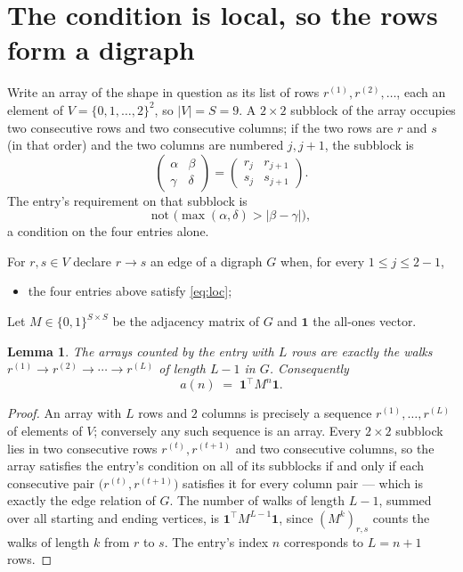 \documentclass[11pt,a4paper]{article}
\theoremstyle{plain}
\newtheorem{lemma}[theorem]{Lemma}
\theoremstyle{definition}
\begin{document}
\section{The condition is local, so the rows form a digraph}

Write an array of the shape in question as its list of rows
$r^{(1)},r^{(2)},\dots$, each an element of
$V=\{0,1,\dots,2\}^{2}$, so $|V|=S=9$. A $2\times2$ subblock of the array
occupies two consecutive rows and two consecutive columns; if the two rows are $r$
and $s$ (in that order) and the two columns are numbered $j,j+1$,
the subblock is
\[
\begin{pmatrix}\alpha&\beta\\\gamma&\delta\end{pmatrix}=\begin{pmatrix}r_j&r_{j+1}\\s_j&s_{j+1}\end{pmatrix}.
\]
The entry's requirement on that subblock is
\begin{equation}\label{eq:loc}
\text{not }\bigl(\max(\alpha,\delta)>|\beta-\gamma|\bigr),
\end{equation}
a condition on the four entries alone.

For $r,s\in V$ declare $r\to s$ an edge of a digraph $G$ when, for every
$1\le j\le 2-1$,
\begin{itemize}
\item the four entries above satisfy \eqref{eq:loc};

\end{itemize}
Let $M\in\{0,1\}^{S\times S}$ be the adjacency matrix of $G$ and $\mathbf{1}$ the
all-ones vector.

\begin{lemma}\label{lem:walk}
The arrays counted by the entry with $L$ rows are exactly the walks
$r^{(1)}\to r^{(2)}\to\cdots\to r^{(L)}$ of length $L-1$ in $G$. Consequently
\[
a(n)\;=\;\mathbf{1}^{\!\top}M^{n}\mathbf{1} .
\]
\end{lemma}

\begin{proof}
An array with $L$ rows and $2$ columns is precisely a sequence
$r^{(1)},\dots,r^{(L)}$ of elements of $V$; conversely any such sequence is an array.
Every $2\times2$ subblock lies in two consecutive rows $r^{(t)},r^{(t+1)}$ and two
consecutive columns, so the array satisfies the entry's condition on all of its subblocks
if and only if each consecutive pair $\bigl(r^{(t)},r^{(t+1)}\bigr)$ satisfies it for
every column pair --- which is exactly the edge relation of $G$. The number of walks of
length $L-1$, summed over all starting and ending vertices, is
$\mathbf{1}^{\!\top}M^{L-1}\mathbf{1}$, since $(M^{k})_{r,s}$ counts the walks of
length $k$ from $r$ to $s$. The entry's index $n$ corresponds to $L=n+1$ rows.
\end{proof}
\end{document}
